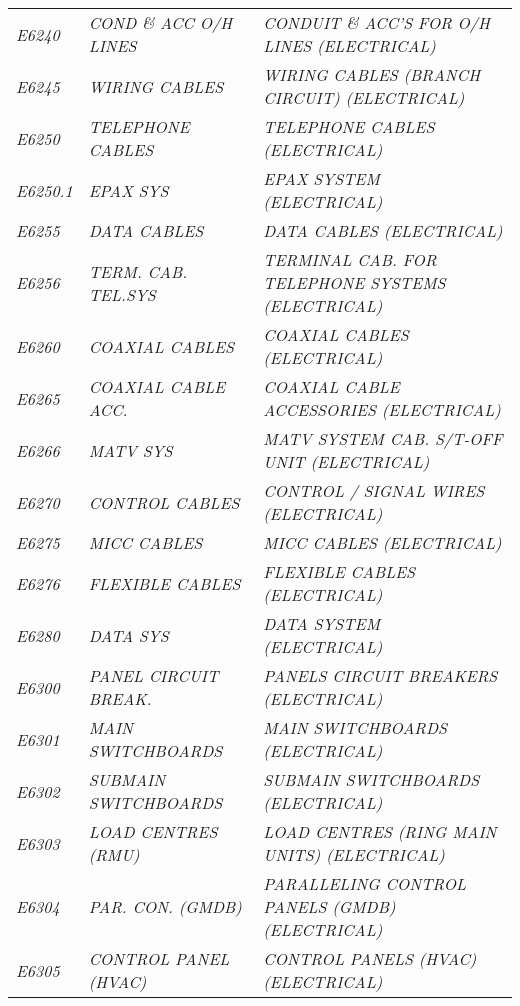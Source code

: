\begin{landscape}
\begin{longtable}[l]{l%
                  l|%
                  l|}
\itshape E6240       &\itshape COND \& ACC O/H LINES   &\itshape CONDUIT \& ACC'S FOR O/H LINES (ELECTRICAL)   \\
\itshape E6245       &\itshape WIRING CABLES   &\itshape WIRING CABLES (BRANCH CIRCUIT) (ELECTRICAL)   \\
\itshape E6250       &\itshape TELEPHONE CABLES   &\itshape TELEPHONE CABLES (ELECTRICAL)   \\
\itshape E6250.1     &\itshape EPAX SYS   &\itshape EPAX SYSTEM (ELECTRICAL)   \\
\itshape E6255       &\itshape DATA CABLES   &\itshape DATA CABLES (ELECTRICAL)   \\
\itshape E6256       &\itshape TERM. CAB. TEL.SYS   &\itshape TERMINAL CAB. FOR TELEPHONE SYSTEMS (ELECTRICAL)   \\
\itshape E6260       &\itshape COAXIAL CABLES   &\itshape COAXIAL CABLES (ELECTRICAL)   \\
\itshape E6265       &\itshape COAXIAL CABLE ACC.   &\itshape COAXIAL CABLE ACCESSORIES (ELECTRICAL)   \\
\itshape E6266       &\itshape MATV SYS   &\itshape MATV SYSTEM CAB. S/T-OFF UNIT (ELECTRICAL)   \\
\itshape E6270       &\itshape CONTROL CABLES   &\itshape CONTROL / SIGNAL WIRES (ELECTRICAL)   \\
\itshape E6275       &\itshape MICC CABLES   &\itshape MICC CABLES (ELECTRICAL)   \\
\itshape E6276       &\itshape FLEXIBLE CABLES   &\itshape FLEXIBLE CABLES (ELECTRICAL)   \\
\itshape E6280       &\itshape DATA SYS   &\itshape DATA SYSTEM (ELECTRICAL)   \\
\itshape E6300       &\itshape PANEL CIRCUIT BREAK.   &\itshape PANELS CIRCUIT BREAKERS (ELECTRICAL)   \\
\itshape E6301       &\itshape MAIN SWITCHBOARDS   &\itshape MAIN SWITCHBOARDS (ELECTRICAL)   \\
\itshape E6302       &\itshape SUBMAIN SWITCHBOARDS   &\itshape SUBMAIN SWITCHBOARDS (ELECTRICAL)   \\
\itshape E6303       &\itshape LOAD CENTRES (RMU)   &\itshape LOAD CENTRES (RING MAIN UNITS) (ELECTRICAL)   \\
\itshape E6304       &\itshape PAR. CON. (GMDB)   &\itshape PARALLELING CONTROL PANELS (GMDB) (ELECTRICAL)   \\
\itshape E6305       &\itshape CONTROL PANEL (HVAC)   &\itshape CONTROL PANELS (HVAC) (ELECTRICAL)   \\

\end{longtable}
\end{landscape}
